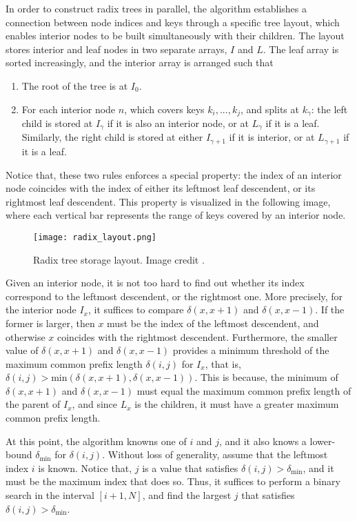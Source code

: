 In order to construct radix trees in parallel, the algorithm\cite{bvh_build} establishes a connection between node indices and keys through a specific tree layout, which enables interior nodes to be built simultaneously with their children. The layout stores interior and leaf nodes in two separate arrays, $I$ and $L$. The leaf array is sorted increasingly, and the interior array is arranged such that
\begin{enumerate}
    \item The root of the tree is at $I_0$.
    
    \item For each interior node $n$, which covers keys $k_i,...,k_j$, and splits at $k_\gamma$: the left child is stored at $I_\gamma$ if it is also an interior node, or at $L_\gamma$ if it is a leaf. Similarly, the right child is stored at either $I_{\gamma+1}$ if it is interior, or at $L_{\gamma+1}$ if it is a leaf.
\end{enumerate}

Notice that, these two rules enforces a special property: the index of an interior node coincides with the index of either its leftmost leaf descendent, or its rightmost leaf descendent. This property is visualized in the following image, where each vertical bar represents the range of keys covered by an interior node.
\begin{figure}[H]
    \centering
    \texttt{[image: radix\_layout.png]}
    \caption{Radix tree storage layout. Image credit \cite{bvh_build}.}
\end{figure}

Given an interior node, it is not too hard to find out whether its index correspond to the leftmost descendent, or the rightmost one. More precisely, for the interior node $I_{x}$, it suffices to compare $\delta(x,x+1)$ and $\delta(x,x-1)$. If the former is larger, then $x$ must be the index of the leftmost descendent, and otherwise $x$ coincides with the rightmost descendent. Furthermore, the smaller value of $\delta(x,x+1)$ and $\delta(x,x-1)$ provides a minimum threshold of the maximum common prefix length $\delta(i,j)$ for $I_x$, that is, $\delta(i,j)> \text{min}(\delta(x,x+1),\delta(x,x-1))$. This is because, the minimum of $\delta(x,x+1)$ and $\delta(x,x-1)$ must equal the maximum common prefix length of the parent of $I_x$, and since $L_x$ is the children, it must have a greater maximum common prefix length. 

At this point, the algorithm knowns one of $i$ and $j$, and it also knows a lower-bound $\delta_{\text{min}}$ for $\delta(i,j)$. Without loss of generality, assume that the leftmost index $i$ is known. Notice that, $j$ is a value that satisfies $\delta(i,j)>\delta_{\text{min}}$, and it must be the maximum index that does so. Thus, it suffices to perform a binary search in the interval $[i+1,N]$, and find the largest $j$ that satisfies $\delta(i,j)>\delta_{\text{min}}$. 

